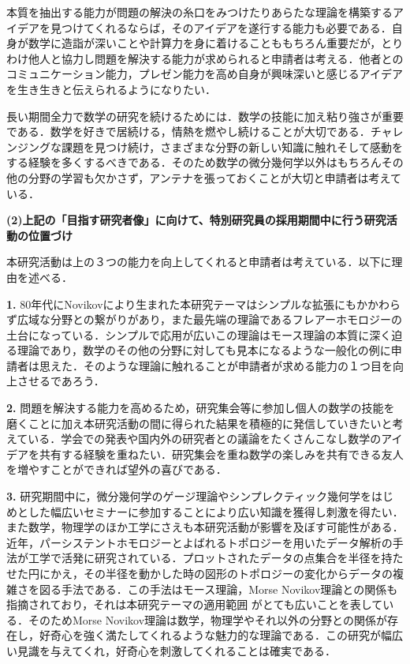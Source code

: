 \documentclass[11pt,a4j,dvipdfmx]{jarticle} 					%
\newcommand{\研究課題名}{象の卵}
\newcommand{\研究機関名}{京都大学}
\newcommand{\研究代表者氏名}{福士謙二}
\begin{document}
\noindent
{}

本質を抽出する能力が問題の解決の糸口をみつけたりあらたな理論を構築するアイデアを見つけてくれるならば，そのアイデアを遂行する能力も必要である．自身が数学に造詣が深いことや計算力を身に着けることももちろん重要だが，とりわけ他人と協力し問題を解決する能力が求められると申請者は考える．他者とのコミュニケーション能力，プレゼン能力を高め自身が興味深いと感じるアイデアを生き生きと伝えられるようになりたい．


\noindent
{}

長い期間全力で数学の研究を続けるためには．数学の技能に加え粘り強さが重要である．数学を好きで居続ける，情熱を燃やし続けることが大切である．チャレンジングな課題を見つけ続け，さまざまな分野の新しい知識に触れそして感動をする経験を多くするべきである．そのため数学の微分幾何学以外はもちろんその他の分野の学習も欠かさず，アンテナを張っておくことが大切と申請者は考えている．


\vspace{5mm}
\noindent
\textbf{(2)上記の「目指す研究者像」に向けて、特別研究員の採用期間中に行う研究活動の位置づけ}



本研究活動は上の３つの能力を向上してくれると申請者は考えている．以下に理由を述べる．


\noindent\textbf{1. }80年代にNovikovにより生まれた本研究テーマはシンプルな拡張にもかかわらず広域な分野との繋がりがあり，また最先端の理論であるフレアーホモロジーの土台になっている．シンプルで応用が広いこの理論はモース理論の本質に深く迫る理論であり，数学のその他の分野に対しても見本になるような一般化の例に申請者は思えた．そのような理論に触れることが申請者が求める能力の１つ目を向上させるであろう．


\noindent\textbf{2. }問題を解決する能力を高めるため，研究集会等に参加し個人の数学の技能を磨くことに加え本研究活動の間に得られた結果を積極的に発信していきたいと考えている．学会での発表や国内外の研究者との議論をたくさんこなし数学のアイデアを共有する経験を重ねたい．研究集会を重ね数学の楽しみを共有できる友人を増やすことができれば望外の喜びである．


\noindent\textbf{3. }研究期間中に，微分幾何学のゲージ理論やシンプレクティック幾何学をはじめとした幅広いセミナーに参加することにより広い知識を獲得し刺激を得たい．また数学，物理学のほか工学にさえも本研究活動が影響を及ぼす可能性がある．近年，パーシステントホモロジーとよばれるトポロジーを用いたデータ解析の手法が工学で活発に研究されている．プロットされたデータの点集合を半径を持たせた円にかえ，その半径を動かした時の図形のトポロジーの変化からデータの複雑さを図る手法である．この手法はモース理論，Morse Novikov理論との関係も指摘されており，それは本研究テーマの適用範囲
がとても広いことを表している．そのためMorse Novikov理論は数学，物理学やそれ以外の分野との関係が存在し，好奇心を強く満たしてくれるような魅力的な理論である．この研究が幅広い見識を与えてくれ，好奇心を刺激してくれることは確実である．







\end{document}
